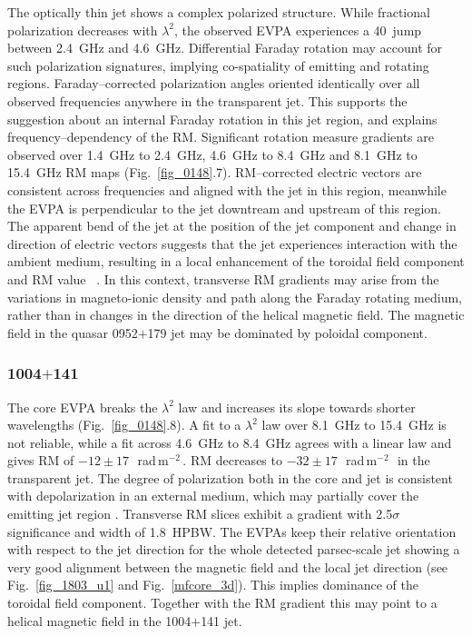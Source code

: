\documentclass[a4paper,fleqn,usenatbib,useAMS]{mnras}
\newcommand{\rmu}{\,rad\,m$^{-2}$\,} %
\begin{document}
The optically thin jet shows a complex polarized structure. 
While fractional polarization decreases with $\lambda^2$, the observed EVPA experiences a 40\degr\ jump between 2.4~GHz and 4.6~GHz. 
Differential Faraday rotation \citep{gardner_whiteoak_66,sokoloff_etal98} may account for such polarization signatures, implying co-spatiality of emitting and rotating regions.
Faraday--corrected polarization angles oriented identically over all observed frequencies anywhere in the transparent jet.
This supports the suggestion about an internal Faraday rotation in this jet region, and explains frequency--dependency of the RM.
Significant rotation measure gradients are observed over 1.4~GHz to 2.4~GHz, 4.6~GHz to 8.4~GHz and 8.1~GHz to 15.4~GHz RM maps (Fig.~\ref{fig_0148}.7).
RM--corrected electric vectors are consistent across frequencies and aligned with the jet in this region, meanwhile the EVPA is perpendicular to the jet downtream and upstream of this region.
The apparent bend of the jet at the position of the jet component and change in direction of electric vectors suggests that the jet experiences interaction with the ambient medium, resulting in a local enhancement of the toroidal field component and RM value ~\citep[see, e.g.][]{2008ApJ...681L..69G}.
In this context, transverse RM gradients may arise from the variations in magneto-ionic density and path along the Faraday rotating medium, rather than in changes in the direction of the helical magnetic field. 
The magnetic field in the quasar 0952$+$179 jet may be dominated by poloidal component.

\subsubsection{1004$+$141}
The core EVPA breaks the $\lambda^2$ law and increases its slope towards shorter wavelengths (Fig.~\ref{fig_0148}.8).
A fit to a $\lambda^2$ law over 8.1~GHz to 15.4~GHz is not reliable, while a fit across 4.6~GHz to 8.4~GHz agrees with a linear law and gives RM of $-12\pm17$~\rmu.
RM decreases to $-32\pm17$~\rmu\ in the transparent jet. 
The degree of polarization both in the core and jet is consistent with depolarization in an external medium, which may partially cover the emitting jet region \citep{2008AA...487..865R,2009AA...502...61M}.
Transverse RM slices exhibit a gradient with 2.5$\sigma$ significance and width of 1.8~HPBW.
The EVPAs keep their relative orientation with respect to the jet direction for the whole detected parsec-scale jet showing a very good alignment between the magnetic field and the local jet direction (see Fig.~\ref{fig_1803_u1} and Fig.~\ref{mfcore_3d}).
This implies dominance of the toroidal field component.
Together with the RM gradient this may point to a helical magnetic field in the 1004$+$141 jet.
\end{document}

